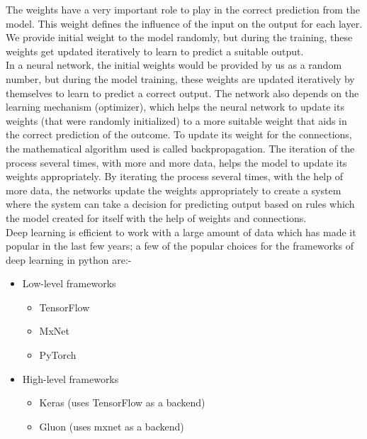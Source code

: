  The weights have a very important role to play in the correct prediction from the model. This weight defines the influence of the input on the output for each layer. We provide initial weight to the model randomly, but during the training, these weights get updated iteratively to learn to predict a suitable output.\\
 In a neural network, the initial weights would be provided by us as a random number, but during the model training, these weights are updated iteratively by themselves to learn to predict a correct output. The network also depends on the learning mechanism (optimizer)\cite{https://doi.org/10.48550/arxiv.1912.08957}, which helps the neural network to update its weights (that were randomly initialized) to a more suitable weight that aids in the correct prediction of the outcome.  To update its weight for the connections, the mathematical algorithm used is called backpropagation\cite{118638}. The iteration of the process several times, with more and more data, helps the model to update its weights appropriately. By iterating the process several times, with the help of more data, the networks update the weights appropriately to create a system where the system can take a decision for predicting output based on rules which the model created for itself with the help of weights and connections.\\


Deep learning is efficient to work with a large amount of data which has made it popular in the last few years; a few of the popular choices for the frameworks of deep learning in python are:-\\
 \begin{itemize}
     \item Low-level frameworks 
         \begin{itemize}
             \item TensorFlow
             \item MxNet
             \item PyTorch
         \end{itemize}
      \item High-level frameworks
         \begin{itemize}
             \item Keras (uses TensorFlow as a backend)
              \item Gluon (uses mxnet as a backend)
         \end{itemize}
 \end{itemize}

